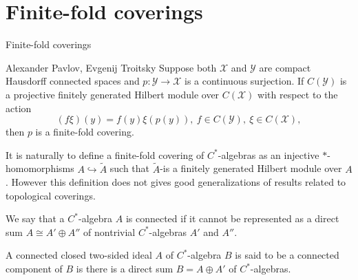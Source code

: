 \documentclass{beamer}
\theoremstyle{plain}
\newcommand{\hookto}{\hookrightarrow}        %
\begin{document}
\section{Finite-fold coverings}
\begin{frame}
	\begin{center}
	\huge{Finite-fold coverings}
	\end{center}
	\begin{theorem} 	\alert{Alexander Pavlov, Evgenij Troitsky}
		Suppose both $\mathcal X$ and $\mathcal Y$ are compact Hausdorff connected spaces and $p :\mathcal  Y \to \mathcal X$
		is a continuous surjection. If $C(\mathcal Y )$ is a projective finitely generated Hilbert module over
		$C(\mathcal X)$ with respect to the action
		\begin{equation*}
			(f\xi)(y) = f(y)\xi(p(y)), ~ f \in  C(\mathcal Y ), ~ \xi \in  C(\mathcal X),
		\end{equation*}
		then $p$ is a finite-fold  covering.
	\end{theorem}
	It is naturally to define a finite-fold covering of $C^*$-algebras as an injective $*$-homomorphisms $A\hookto \widetilde A$ such that $ \widetilde A$-is a finitely generated Hilbert module over
	$A$. However this definition does not gives good generalizations of results  related to topological coverings.
	
\end{frame}
\begin{frame}
  \begin{definition}\label{connected_c_a_defn}
	We say that a $C^*$-algebra $A$ is \alert{connected} if it cannot be represented as a direct sum  $A \cong A' \oplus A''$ of nontrivial $C^*$-algebras $A'$ and $A''$.
	
\end{definition}
\begin{definition}\label{connected_comp_defn}
	A connected closed two-sided ideal $A$ of  $C^*$-algebra $B$ is said to be a \alert{connected component of}  $B$ is there is a direct sum $B = A \oplus A'$ of $C^*$-algebras.
	\end{definition}
\end{frame}
\end{document}
